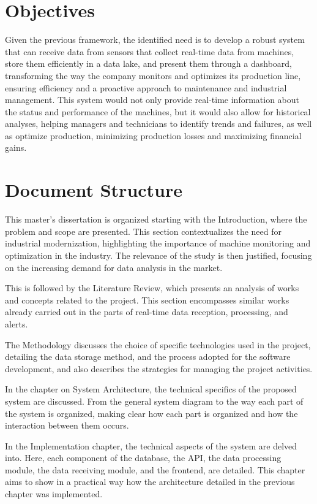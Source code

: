 \section{Objectives}
Given the previous framework, the identified need is to develop a robust system that can receive data from sensors that collect real-time data from machines, store them efficiently in a data lake, and present them through a dashboard, transforming the way the company monitors and optimizes its production line, ensuring efficiency and a proactive approach to maintenance and industrial management. This system would not only provide real-time information about the status and performance of the machines, but it would also allow for historical analyses, helping managers and technicians to identify trends and failures, as well as optimize production, minimizing production losses and maximizing financial gains.

\section{Document Structure}
This master's dissertation is organized starting with the Introduction, where the problem and scope are presented. This section contextualizes the need for industrial modernization, highlighting the importance of machine monitoring and optimization in the industry. The relevance of the study is then justified, focusing on the increasing demand for data analysis in the market.

This is followed by the Literature Review, which presents an analysis of works and concepts related to the project. This section encompasses similar works already carried out in the parts of real-time data reception, processing, and alerts.

The Methodology discusses the choice of specific technologies used in the project, detailing the data storage method, and the process adopted for the software development, and also describes the strategies for managing the project activities.

In the chapter on System Architecture, the technical specifics of the proposed system are discussed. From the general system diagram to the way each part of the system is organized, making clear how each part is organized and how the interaction between them occurs.

In the Implementation chapter, the technical aspects of the system are delved into. Here, each component of the database, the \gls{API}, the data processing module, the data receiving module, and the frontend, are detailed. This chapter aims to show in a practical way how the architecture detailed in the previous chapter was implemented.

